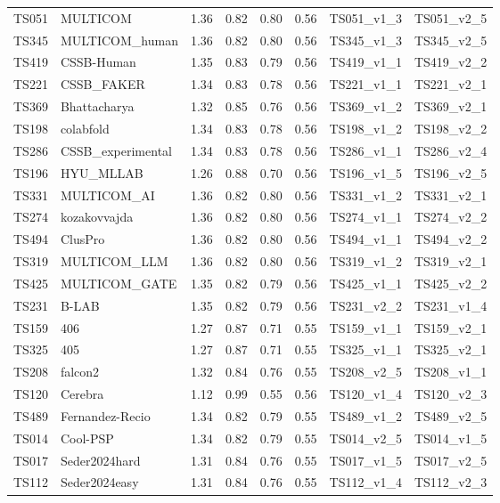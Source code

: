 \begin{longtable}{llllllll}
TS051 & MULTICOM & 1.36 & 0.82 & 0.80 & 0.56 & TS051\_v1\_3 & TS051\_v2\_5 \\ 
TS345 & MULTICOM\_human & 1.36 & 0.82 & 0.80 & 0.56 & TS345\_v1\_3 & TS345\_v2\_5 \\ 
TS419 & CSSB-Human & 1.35 & 0.83 & 0.79 & 0.56 & TS419\_v1\_1 & TS419\_v2\_2 \\ 
TS221 & CSSB\_FAKER & 1.34 & 0.83 & 0.78 & 0.56 & TS221\_v1\_1 & TS221\_v2\_1 \\ 
TS369 & Bhattacharya & 1.32 & 0.85 & 0.76 & 0.56 & TS369\_v1\_2 & TS369\_v2\_1 \\ 
TS198 & colabfold & 1.34 & 0.83 & 0.78 & 0.56 & TS198\_v1\_2 & TS198\_v2\_2 \\ 
TS286 & CSSB\_experimental & 1.34 & 0.83 & 0.78 & 0.56 & TS286\_v1\_1 & TS286\_v2\_4 \\ 
TS196 & HYU\_MLLAB & 1.26 & 0.88 & 0.70 & 0.56 & TS196\_v1\_5 & TS196\_v2\_5 \\ 
TS331 & MULTICOM\_AI & 1.36 & 0.82 & 0.80 & 0.56 & TS331\_v1\_2 & TS331\_v2\_1 \\ 
TS274 & kozakovvajda & 1.36 & 0.82 & 0.80 & 0.56 & TS274\_v1\_1 & TS274\_v2\_2 \\ 
TS494 & ClusPro & 1.36 & 0.82 & 0.80 & 0.56 & TS494\_v1\_1 & TS494\_v2\_2 \\ 
TS319 & MULTICOM\_LLM & 1.36 & 0.82 & 0.80 & 0.56 & TS319\_v1\_2 & TS319\_v2\_1 \\ 
TS425 & MULTICOM\_GATE & 1.35 & 0.82 & 0.79 & 0.56 & TS425\_v1\_1 & TS425\_v2\_2 \\ 
TS231 & B-LAB & 1.35 & 0.82 & 0.79 & 0.56 & TS231\_v2\_2 & TS231\_v1\_4 \\ 
TS159 & 406 & 1.27 & 0.87 & 0.71 & 0.55 & TS159\_v1\_1 & TS159\_v2\_1 \\ 
TS325 & 405 & 1.27 & 0.87 & 0.71 & 0.55 & TS325\_v1\_1 & TS325\_v2\_1 \\ 
TS208 & falcon2 & 1.32 & 0.84 & 0.76 & 0.55 & TS208\_v2\_5 & TS208\_v1\_1 \\ 
TS120 & Cerebra & 1.12 & 0.99 & 0.55 & 0.56 & TS120\_v1\_4 & TS120\_v2\_3 \\ 
TS489 & Fernandez-Recio & 1.34 & 0.82 & 0.79 & 0.55 & TS489\_v1\_2 & TS489\_v2\_5 \\ 
TS014 & Cool-PSP & 1.34 & 0.82 & 0.79 & 0.55 & TS014\_v2\_5 & TS014\_v1\_5 \\ 
TS017 & Seder2024hard & 1.31 & 0.84 & 0.76 & 0.55 & TS017\_v1\_5 & TS017\_v2\_5 \\ 
TS112 & Seder2024easy & 1.31 & 0.84 & 0.76 & 0.55 & TS112\_v1\_4 & TS112\_v2\_3 \\ 

\end{longtable}
